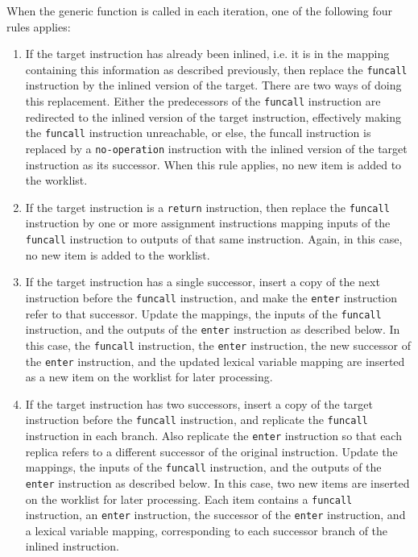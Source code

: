 When the generic function is called in each iteration, one of the
following four rules applies:

\begin{enumerate}
\item If the target instruction has already been inlined, i.e. it is
  in the mapping containing this information as described previously,
  then replace the \texttt{funcall} instruction by the inlined version
  of the target.  There are two ways of doing this replacement.
  Either the predecessors of the \texttt{funcall} instruction are
  redirected to the inlined version of the target instruction,
  effectively making the \texttt{funcall} instruction unreachable, or
  else, the funcall instruction is replaced by a \texttt{no-operation}
  instruction with the inlined version of the target instruction as
  its successor.  When this rule applies, no new item is added to the
  worklist.
\item If the target instruction is a \texttt{return} instruction, then
  replace the \texttt{funcall} instruction by one or more assignment
  instructions mapping inputs of the \texttt{funcall} instruction to
  outputs of that same instruction.  Again, in this case, no new item
  is added to the worklist.
\item If the target instruction has a single successor, insert a copy
  of the next instruction before the \texttt{funcall} instruction, and
  make the \texttt{enter} instruction refer to that successor.  Update
  the mappings, the inputs of the \texttt{funcall} instruction, and
  the outputs of the \texttt{enter} instruction as described below.
  In this case, the \texttt{funcall} instruction, the \texttt{enter}
  instruction, the new successor of the \texttt{enter} instruction,
  and the updated lexical variable mapping are inserted as a new item
  on the worklist for later processing.
\item If the target instruction has two successors, insert a copy of
  the target instruction before the \texttt{funcall} instruction, and
  replicate the \texttt{funcall} instruction in each branch.  Also
  replicate the \texttt{enter} instruction so that each replica refers
  to a different successor of the original instruction.  Update the
  mappings, the inputs of the \texttt{funcall} instruction, and the
  outputs of the \texttt{enter} instruction as described below.  In
  this case, two new items are inserted on the worklist for later
  processing.  Each item contains a \texttt{funcall} instruction, an
  \texttt{enter} instruction, the successor of the \texttt{enter}
  instruction, and a lexical variable mapping, corresponding to each
  successor branch of the inlined instruction.
\end{enumerate}


